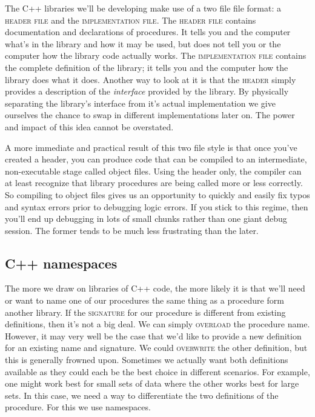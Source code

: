 \documentclass[]{tufte-handout}
\begin{document}
The C++ libraries we'll be developing make use of a two file file format: a \textsc{header file} and the \textsc{implementation file}. The \textsc{header file} contains documentation and declarations of procedures.  It tells you and the computer what's in the library and how it may be used, but does not tell you or the computer how the library code actually works.  The \textsc{implementation file} contains the complete definition of the library; it tells you and the computer how the library does what it does.  Another way to look at it is that the \textsc{header} simply provides a description of the \textit{interface} provided by the library.  By physically separating the library's interface from it's actual implementation we give ourselves the chance to swap in different implementations later on.  The power and impact of this idea cannot be overstated.  

A more immediate and practical result of this two file style is that once you've created a header, you can produce code that can be compiled to an intermediate, non-executable stage called object files. Using the header only, the compiler can at least recognize that library procedures are being called more or less correctly.  So compiling to object files gives us an opportunity to  quickly and easily fix typos and syntax errors prior to debugging logic errors.  If you stick to this regime, then you'll end up debugging in lots of small chunks rather than one giant debug session. The former tends to be much less frustrating than the later. 

\subsection{C++ namespaces}

The more we draw on libraries of C++ code, the more likely it is that we'll need or want to name one of our procedures the same thing as a procedure form another library. If the \textsc{signature} for our procedure is different from existing definitions, then it's not a big deal. We can simply \textsc{overload} the procedure name. However, it may very well be the case that we'd like to provide a new definition for an existing name and signature. We could \textsc{overwrite} the other definition, but this is generally frowned upon.  Sometimes we actually want both definitions available as they could each be the best choice in different scenarios.  For example, one might work best for small sets of data where the other works best for large sets. In this case, we need a way to differentiate the two definitions of the procedure. For this we use namespaces.
\end{document}
